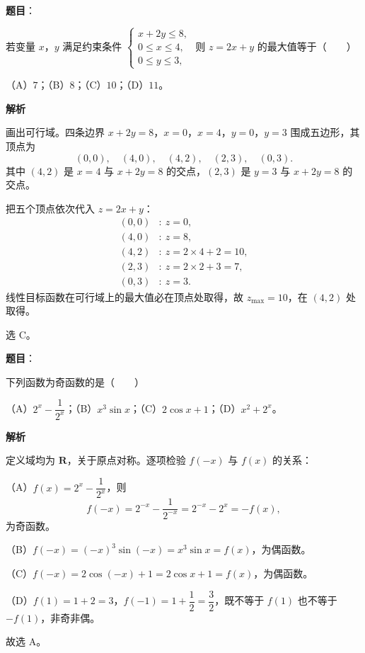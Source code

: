 \begin{answer}

\textbf{题目}：

若变量 $x$，$y$ 满足约束条件 $\begin{cases}x+2y\leqslant 8,\\0\leqslant x\leqslant 4,\\0\leqslant y\leqslant 3,\end{cases}$ 则 $z=2x+y$ 的最大值等于\mbox{（　　）}

（A）$7$；（B）$8$；（C）$10$；（D）$11$。

\textbf{解析}

画出可行域。四条边界 $x+2y=8$，$x=0$，$x=4$，$y=0$，$y=3$ 围成五边形，其顶点为
\nopagebreak[4]
\[(0,0),\quad(4,0),\quad(4,2),\quad(2,3),\quad(0,3).\]
其中 $(4,2)$ 是 $x=4$ 与 $x+2y=8$ 的交点，$(2,3)$ 是 $y=3$ 与 $x+2y=8$ 的交点。

把五个顶点依次代入 $z=2x+y$：
\nopagebreak[4]
\[\begin{aligned}
(0,0)&:\ z=0,\\
(4,0)&:\ z=8,\\
(4,2)&:\ z=2\times4+2=10,\\
(2,3)&:\ z=2\times2+3=7,\\
(0,3)&:\ z=3.
\end{aligned}\]
线性目标函数在可行域上的最大值必在顶点处取得，故 $z_{\max}=10$，在 $(4,2)$ 处取得。

选 C。


\end{answer}
\begin{answer}

\textbf{题目}：

下列函数为奇函数的是\mbox{（　　）}

（A）$2^x-\dfrac1{2^x}$；（B）$x^3\sin x$；（C）$2\cos x+1$；（D）$x^2+2^x$。

\textbf{解析}

定义域均为 $\mathbf R$，关于原点对称。逐项检验 $f(-x)$ 与 $f(x)$ 的关系：

（A）$f(x)=2^x-\dfrac1{2^x}$，则
\nopagebreak[4]
\[f(-x)=2^{-x}-\frac1{2^{-x}}=2^{-x}-2^{x}=-f(x),\]
为奇函数。

（B）$f(-x)=(-x)^3\sin(-x)=x^3\sin x=f(x)$，为偶函数。

（C）$f(-x)=2\cos(-x)+1=2\cos x+1=f(x)$，为偶函数。

（D）$f(1)=1+2=3$，$f(-1)=1+\dfrac12=\dfrac32$，既不等于 $f(1)$ 也不等于 $-f(1)$，非奇非偶。

故选 A。


\end{answer}
